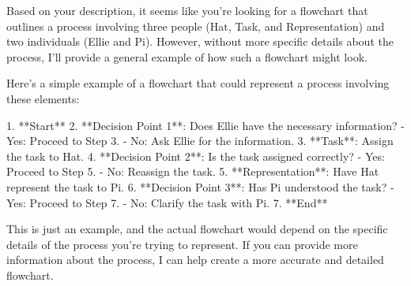 Based on your description, it seems like you're looking for a flowchart that outlines a process involving three people (Hat, Task, and Representation) and two individuals (Ellie and Pi). However, without more specific details about the process, I'll provide a general example of how such a flowchart might look.

Here's a simple example of a flowchart that could represent a process involving these elements:

1. **Start**
2. **Decision Point 1**: Does Ellie have the necessary information?
   - Yes: Proceed to Step 3.
   - No: Ask Ellie for the information.
3. **Task**: Assign the task to Hat.
4. **Decision Point 2**: Is the task assigned correctly?
   - Yes: Proceed to Step 5.
   - No: Reassign the task.
5. **Representation**: Have Hat represent the task to Pi.
6. **Decision Point 3**: Has Pi understood the task?
   - Yes: Proceed to Step 7.
   - No: Clarify the task with Pi.
7. **End**

This is just an example, and the actual flowchart would depend on the specific details of the process you're trying to represent. If you can provide more information about the process, I can help create a more accurate and detailed flowchart.